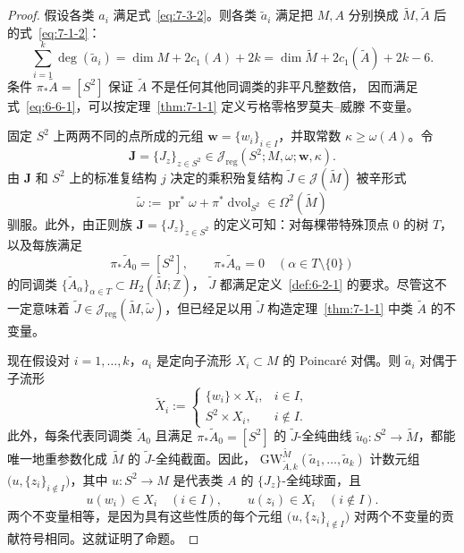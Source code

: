 \begin{proof}
假设各类 $a_i$ 满足式~\eqref{eq:7-3-2}。则各类 $\widetilde a_i$ 满足把 $M,A$ 分别换成
$\widetilde M,\widetilde A$ 后的式~\eqref{eq:7-1-2}：
\[
  \sum_{i=1}^k\deg(\widetilde a_i)
  =\dim M+2c_1(A)+2k
  =\dim\widetilde M+2c_1(\widetilde A)+2k-6.
\]
条件 $\pi_*\widetilde A=[S^2]$ 保证 $\widetilde A$ 不是任何其他同调类的非平凡整数倍，
因而满足式~\eqref{eq:6-6-1}，可以按定理~\ref{thm:7-1-1} 定义亏格零格罗莫夫--威滕
不变量。

固定 $S^2$ 上两两不同的点所成的元组 $\mathbf w=\{w_i\}_{i\in I}$，并取常数
$\kappa\ge\omega(A)$。令
\[
  \mathbf J=\{J_z\}_{z\in S^2}
  \in\mathcal J_{\mathrm{reg}}(S^2;M,\omega;\mathbf w,\kappa).
\]
由 $\mathbf J$ 和 $S^2$ 上的标准复结构 $j$ 决定的乘积殆复结构
$\widetilde J\in\mathcal J(\widetilde M)$ 被辛形式
\[
  \widetilde\omega
  :=\operatorname{pr}^*\omega+\pi^*\operatorname{dvol}_{S^2}
  \in\Omega^2(\widetilde M)
\]
驯服。此外，由正则族
$\mathbf J=\{J_z\}_{z\in S^2}$ 的定义可知：对每棵带特殊顶点
$0$ 的树 $T$，以及每族满足
\[
  \pi_*\widetilde A_0=[S^2],
  \qquad
  \pi_*\widetilde A_\alpha=0\quad(\alpha\in T\setminus\{0\})
\]
的同调类 $\{\widetilde A_\alpha\}_{\alpha\in T}\subset H_2(\widetilde M;\mathbb Z)$，
$\widetilde J$ 都满足定义~\ref{def:6-2-1} 的要求。尽管这不一定意味着
$\widetilde J\in\mathcal J_{\mathrm{reg}}(\widetilde M,\widetilde\omega)$，但已经足以用
$\widetilde J$ 构造定理~\ref{thm:7-1-1} 中类 $\widetilde A$ 的不变量。

现在假设对 $i=1,\ldots,k$，$a_i$ 是定向子流形 $X_i\subset M$ 的 Poincaré 对偶。则
$\widetilde a_i$ 对偶于子流形
\[
  \widetilde X_i:=
  \begin{cases}
    \{w_i\}\times X_i,&i\in I,\\
    S^2\times X_i,&i\notin I.
  \end{cases}
\]
此外，每条代表同调类 $\widetilde A_0$ 且满足
$\pi_*\widetilde A_0=[S^2]$ 的 $\widetilde J$-全纯曲线
$\widetilde u_0:S^2\to\widetilde M$，都能唯一地重参数化成 $\widetilde M$ 的
$\widetilde J$-全纯截面。因此，
$\mathrm{GW}^{\widetilde M}_{\widetilde A,k}(\widetilde a_1,\ldots,\widetilde a_k)$
计数元组 $\bigl(u,\{z_i\}_{i\notin I}\bigr)$，其中 $u:S^2\to M$ 是代表类 $A$ 的
$\{J_z\}$-全纯球面，且
\[
  u(w_i)\in X_i\quad(i\in I),
  \qquad
  u(z_i)\in X_i\quad(i\notin I).
\]
两个不变量相等，是因为具有这些性质的每个元组
$\bigl(u,\{z_i\}_{i\notin I}\bigr)$ 对两个不变量的贡献符号相同。这就证明了命题。
\end{proof}


